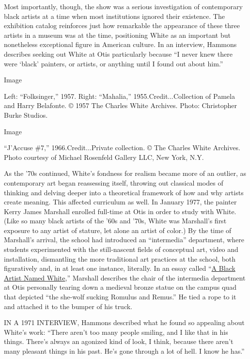Most importantly, though, the show was a serious investigation of
contemporary black artists at a time when most institutions ignored
their existence. The exhibition catalog reinforces just how remarkable
the appearance of these three artists in a museum was at the time,
positioning White as an important but nonetheless exceptional figure in
American culture. In an interview, Hammons describes seeking out White
at Otis particularly because ``I never knew there were `black' painters,
or artists, or anything until I found out about him.''

Image

Left: ``Folksinger,'' 1957. Right: ``Mahalia,'' 1955.Credit...Collection
of Pamela and Harry Belafonte. © 1957 The Charles White Archives. Photo:
Christopher Burke Studios.

Image

``J'Accuse \#7,'' 1966.Credit...Private collection. © The Charles White
Archives. Photo courtesy of Michael Rosenfeld Gallery LLC, New York,
N.Y.

As the '70s continued, White's fondness for realism became more of an
outlier, as contemporary art began reassessing itself, throwing out
classical modes of thinking and delving deeper into a theoretical
framework of how and why artists create meaning. This affected
curriculum as well. In January 1977, the painter Kerry James Marshall
enrolled full-time at Otis in order to study with White. (Like so many
black artists of the '60s and '70s, White was Marshall's first exposure
to any artist of stature, let alone an artist of color.) By the time of
Marshall's arrival, the school had introduced an ``intermedia''
department, where students experimented with the still-nascent fields of
conceptual art, video and installation, dismantling the more traditional
art practices at the school, both figuratively and, in at least one
instance, literally. In an essay called
``\href{https://www.theparisreview.org/blog/2018/05/31/a-black-artist-named-white/}{A
Black Artist Named White},'' Marshall describes the chair of the
intermedia department at Otis personally tearing down a medieval bronze
statue on the campus quad that depicted ``the she-wolf sucking Romulus
and Remus.'' He tied a rope to it and attached it to the bumper of his
truck.

IN A 1971 INTERVIEW, Hammons described what he found so appealing about
White's work: ``There aren't too many people smiling, and I like that in
his things. There's always an agonized kind of look, I think, because
there aren't many pleasant things in his past. He's gone through a lot
of hell. I know he has.''

